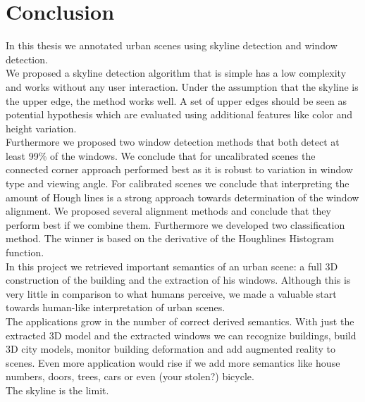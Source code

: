 \section{Conclusion}
In this thesis we annotated urban scenes using skyline detection and window
detection.\\

We proposed a skyline detection algorithm that is simple has a low complexity
and works without any user interaction.  Under the assumption that the skyline is the upper edge, the method works well.  A set of upper edges should be seen
as potential hypothesis which are evaluated using additional features like color
and height variation.\\

Furthermore we proposed two window detection methods that both detect at least
99\% of the windows.  We conclude that for uncalibrated scenes the connected
corner approach performed best as it is robust to variation in window type and
viewing angle.  For calibrated scenes we conclude that 
interpreting the amount of Hough lines is a strong approach
towards determination of the window alignment. 
We proposed several alignment methods and conclude that they
perform best if we combine them.
Furthermore we developed two classification method. The winner is based on the
derivative of the Houghlines Histogram function.  \\

In this project we retrieved important semantics of an urban scene: a
full 3D construction of the building and the extraction of his windows.
Although this is very little in comparison to what humans perceive, we made a
valuable start towards human-like interpretation of urban scenes.\\

The applications grow in the number of correct derived semantics. With just the
extracted 3D model and the extracted windows we can recognize buildings,
build 3D city models, monitor building deformation and add augmented reality
to scenes.  Even more application would rise if we add more semantics like
house numbers, doors, trees, cars or even (your stolen?) bicycle. \\

The skyline is the limit.

